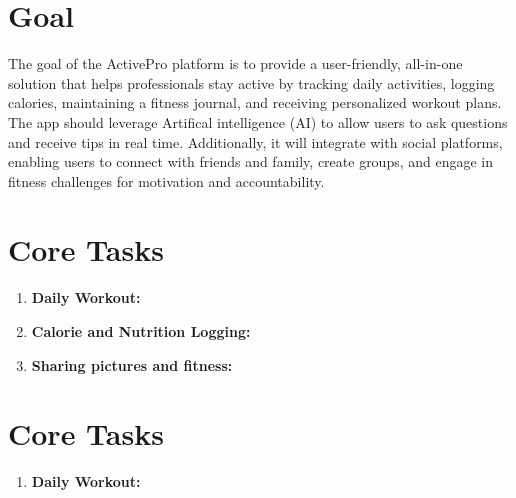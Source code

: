 \documentclass[letterpaper,11pt]{texMemo} %
\begin{document}
\maketitle %

\section{Goal}

The goal of the ActivePro platform is to provide a user-friendly, all-in-one solution that helps professionals stay active by tracking daily activities, logging calories, maintaining a fitness journal, and receiving personalized workout plans. The app should leverage Artifical intelligence (AI) to allow users to ask questions and receive tips in real time. Additionally, it will integrate with social platforms, enabling users to connect with friends and family, create groups, and engage in fitness challenges for motivation and accountability.


\section{Core Tasks}
  	
\begin{enumerate}

\item \bf{Daily Workout:}
 
\item  \bfseries{Calorie and Nutrition Logging:}

\item  \bf{Sharing pictures and fitness:}  
\end{enumerate}
\section{Core Tasks}

\begin{enumerate}
	
	\item \bf{Daily Workout:}

\end{enumerate}
\end{document}
